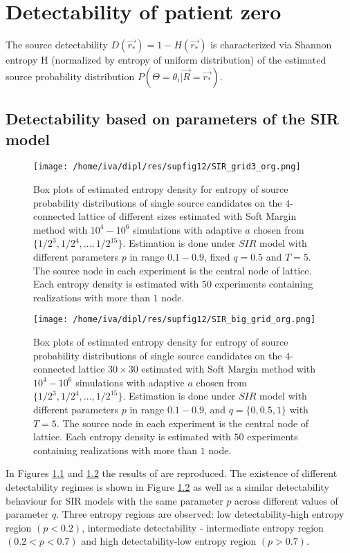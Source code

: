 \documentclass[times, utf8, diplomski]{fer}
\begin{document}
\chapter{Detectability of patient zero} 

The source detectability $D(\vec{r_*}) = 1 - H(\vec{r_*})$ is characterized via Shannon entropy H (normalized by entropy of uniform distribution) of the estimated source probability distribution $P(\Theta = \theta_i |\vec{R} = \vec{r_*}).$

\section{Detectability based on parameters of the SIR model}
\begin{figure}[H]
\texttt{[image: /home/iva/dipl/res/supfig12/SIR\_grid3\_org.png]}
\caption{Box plots of estimated entropy density for entropy of source probability distributions of 
single source candidates on the $4$-connected lattice of different sizes estimated with Soft Margin method with $10^4 - 10^6$ simulations with adaptive $a$ chosen from $\{1/2^3, 1/2^4, \ldots, 1/2^{15}\}$. Estimation is done under $SIR$ model with different parameters $p$ in range $0.1 - 0.9$, fixed $q = 0.5$ and $T = 5$. The source node in each experiment is the central node of lattice. Each entropy density is estimated with $50$ experiments containing realizations with more than $1$ node.}
\label{network_size}
\end{figure}

\begin{figure}[H]
\texttt{[image: /home/iva/dipl/res/supfig12/SIR\_big\_grid\_org.png]}
\caption{Box plots of estimated entropy density for entropy of source probability distributions of 
single source candidates on the $4$-connected lattice $30 \times 30$ estimated with Soft Margin method with $10^4 - 10^6$ simulations with adaptive $a$ chosen from $\{1/2^3, 1/2^4, \ldots, 1/2^{15}\}$. Estimation is done under $SIR$ model with different parameters $p$ in range $0.1 - 0.9$, and $q = \{0, 0.5, 1\}$ with $T = 5$. The source node in each experiment is the central node of lattice. Each entropy density is estimated with $50$ experiments containing realizations with more than $1$ node.}
\label{entropy_zones}
\end{figure}

In Figures \ref{network_size} and \ref{entropy_zones} the results of \cite{Nino} are reproduced. The existence of different detectability regimes is shown in Figure \ref{entropy_zones} as well as a similar detectability behaviour for SIR models with the same parameter $p$ across different values of parameter $q$.  Three entropy regions are observed: low detectability-high entropy region $(p < 0.2)$, intermediate detectability - intermediate entropy region $(0.2 < p < 0.7)$ and high detectability-low entropy region $(p > 0.7)$.
\end{document}
